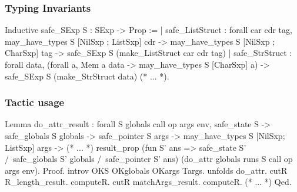 \documentclass{beamer}
\begin{document}
\frame{\questiontoc}

\begin{frame}[fragile]
    \label{frame:proofs}
    \frametitle{Typing Invariants}

\begin{coqcode}
Inductive safe_SExp S : SExp -> Prop :=
  | safe_ListStruct : forall car cdr tag,
      may_have_types S [NilSxp ; ListSxp] cdr ->
      may_have_types S [NilSxp ; CharSxp] tag ->
      safe_SExp S (make_ListStruct car cdr tag)
  | safe_StrStruct : forall data,
      (forall a, Mem a data ->
        may_have_types S [CharSxp] a) ->
      safe_SExp S (make_StrStruct data)
  (* ... *).
\end{coqcode}

\end{frame}

\begin{frame}[fragile]
    \frametitle{Tactic usage}

\begin{coqcode}
Lemma do_attr_result :
  forall S globals call op args env,
  safe_state S ->
  safe_globals S globals ->
  safe_pointer S args ->
  may_have_types S [NilSxp; ListSxp] args ->
  (* ... *)
  result_prop (fun S' ans =>
      safe_state S' /\ safe_globals S' globals
      /\ safe_pointer S' ans)
    (do_attr globals runs S call op args env).
Proof.
  introv OKS OKglobals OKargs Targs. unfolds do_attr.
  cutR R_length_result. computeR.
  cutR matchArgs_result. computeR.
  (* ... *)
Qed.
\end{coqcode}
\end{frame}

\frame{\questiontoc}
\end{document}
